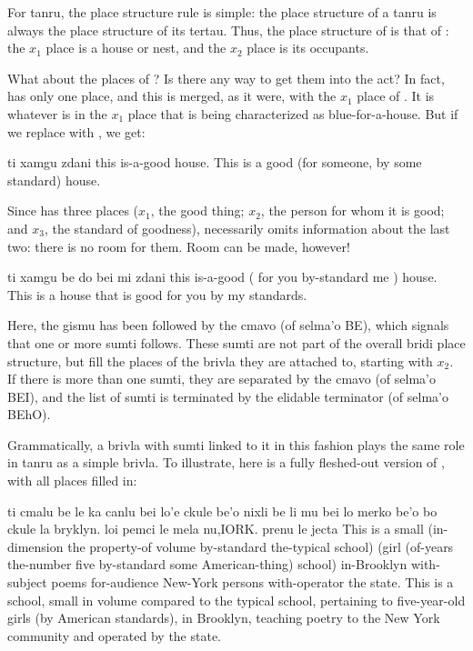 For tanru, the place structure rule is simple: the place
    structure of a tanru is always the place structure of its
    tertau. Thus, the place structure of  is that of
    : the $x_1$ place is a house or nest, and the $x_2$ place is
    its occupants.

What about the places of ? Is there any way to get
    them into the act? In fact,  has only one place, and
    this is merged, as it were, with the $x_1$ place of . It
    is whatever is in the $x_1$ place that is being characterized as
    blue-for-a-house. But if we replace  with ,
    we get:
\begin{example}
ti xamgu zdani\n
this is-a-good house.\n
This is a good (for someone, by some standard) house.
\end{example}

Since  has three places ($x_1$, the good thing; $x_2$,
    the person for whom it is good; and $x_3$, the standard of
    goodness),  necessarily omits
    information about the last two: there is no room for them. Room
    can be made, however!
\begin{example}
ti xamgu be do bei mi  zdani\n
this is-a-good ( for you by-standard me ) house.\n
This is a house that is good for you by my standards.
\end{example}

Here, the gismu  has been followed by the cmavo 
    (of selma'o BE), which signals that one or more sumti follows.
    These sumti are not part of the overall bridi place structure,
    but fill the places of the brivla they are attached to,
    starting with $x_2$. If there is more than one sumti, they are
    separated by the cmavo  (of selma'o BEI), and the list
    of sumti is terminated by the elidable terminator  (of
    selma'o BEhO). 

Grammatically, a brivla with sumti linked to it in this
    fashion plays the same role in tanru as a simple brivla. To
    illustrate, here is a fully fleshed-out version of , with all places filled in:
\begin{example}
ti cmalu be le ka canlu\n
\T	\T	bei lo'e ckule be'o\n
\T	nixli be li mu\n
\T	\T	bei lo merko be'o bo\n
\T	ckule la bryklyn. loi pemci\n
\T	\T	le mela nu,IORK. prenu\n
\T	\T	le jecta\n
This is a small (in-dimension the property-of volume\n
\T	\T	by-standard the-typical school)\n
\T	(girl (of-years the-number five\n
\T	\T	by-standard some American-thing)\n
\T	school) in-Brooklyn with-subject poems\n
\T	\T	for-audience New-York persons\n
\T	\T	with-operator the state.\n
This is a school, small in volume compared to the\n
\T	typical school, pertaining to five-year-old\n
\T	girls (by American standards), in Brooklyn,\n
\T	teaching poetry to the New York community\n
\T	and operated by the state.
\end{example}

